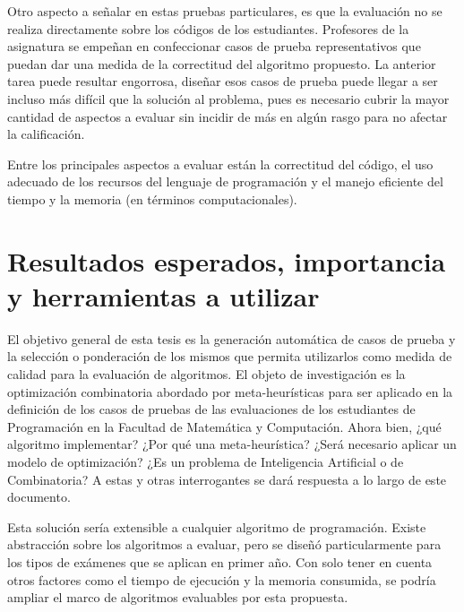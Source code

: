 \documentclass[a4paper,12pt]{book}
\begin{document}
		Otro aspecto a señalar en estas pruebas particulares, es que la evaluación no se realiza directamente sobre los códigos de los estudiantes. Profesores de la asignatura se empeñan en confeccionar casos de prueba representativos que puedan dar una medida de la correctitud del algoritmo propuesto. La anterior tarea puede resultar engorrosa, diseñar esos casos de prueba puede llegar a ser incluso más difícil que la solución al problema, pues es necesario cubrir la mayor cantidad de aspectos a evaluar sin incidir de más en algún rasgo para no afectar la calificación.
		
		Entre los principales aspectos a evaluar están la correctitud del código, el uso adecuado de los recursos del lenguaje de programación y el manejo eficiente del tiempo y la memoria (en términos computacionales).
		

	\section{Resultados esperados, importancia y herramientas a utilizar}
	
		El objetivo general de esta tesis es la generación automática de casos de prueba y la selección o ponderación de los mismos que permita utilizarlos como medida de calidad para la evaluación de algoritmos. El objeto de investigación es la optimización combinatoria abordado por meta-heurísticas \cite{OptimizacionCombinatoria} para ser aplicado en la definición de los casos de pruebas de las evaluaciones de los estudiantes de Programación en la Facultad de Matemática y Computación. Ahora bien, ¿qué algoritmo implementar? ¿Por qué una meta-heurística? ¿Será necesario aplicar un modelo de optimización? ¿Es un problema de Inteligencia Artificial o de Combinatoria? A estas y otras interrogantes se dará respuesta a lo largo de este documento.
		
		Esta solución sería extensible a cualquier algoritmo de programación. Existe abstracción sobre los algoritmos a evaluar, pero se diseñó particularmente para los tipos de exámenes que se aplican en primer año. Con solo tener en cuenta otros factores como el tiempo de ejecución y la memoria consumida, se podría ampliar el marco de algoritmos evaluables por esta propuesta.  
		
\end{document}
